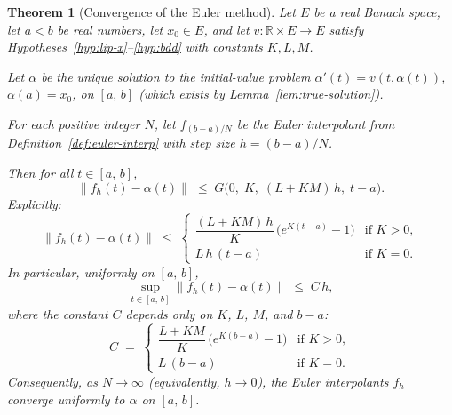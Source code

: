 \documentclass[11pt,a4paper]{article}
\newtheorem{theorem}{Theorem}[section]
\theoremstyle{definition}
\newcommand{\norm}[1]{\lVert #1 \rVert}
\newcommand{\R}{\mathbb{R}}
\newcommand{\Icc}[2]{[#1,\, #2]}
\begin{document}
\begin{theorem}[Convergence of the Euler method]
\label{thm:main}
Let $E$ be a real Banach space, let $a < b$ be real numbers,
let $x_0 \in E$, and let $v \colon \R \times E \to E$ satisfy
Hypotheses~\ref{hyp:lip-x}--\ref{hyp:bdd} with constants $K, L, M$.

Let $\alpha$ be the unique solution to the initial-value problem
$\alpha'(t) = v(t, \alpha(t))$, $\alpha(a) = x_0$, on $\Icc{a}{b}$
(which exists by Lemma~\ref{lem:true-solution}).

For each positive integer $N$, let $f_{(b-a)/N}$ be the Euler
interpolant from Definition~\ref{def:euler-interp} with step size
$h = (b-a)/N$.

Then for all $t \in \Icc{a}{b}$,
\begin{equation}\label{eq:main-bound}
  \norm{f_h(t) - \alpha(t)}
  \;\le\; G\bigl(0,\; K,\; (L + KM)\,h,\; t - a\bigr).
\end{equation}
Explicitly:
\begin{equation}\label{eq:main-explicit}
  \norm{f_h(t) - \alpha(t)}
  \;\le\;
  \begin{cases}
    \dfrac{(L + KM)\,h}{K}\,
    \bigl(e^{K(t-a)} - 1\bigr)
    & \text{if } K > 0, \\[6pt]
    L\,h\,(t - a)
    & \text{if } K = 0.
  \end{cases}
\end{equation}
In particular, uniformly on $\Icc{a}{b}$,
\begin{equation}\label{eq:main-uniform}
  \sup_{t \in \Icc{a}{b}} \norm{f_h(t) - \alpha(t)}
  \;\le\; C\,h,
\end{equation}
where the constant $C$ depends only on $K$, $L$, $M$, and $b - a$:
\begin{equation}\label{eq:C-def}
  C \;=\;
  \begin{cases}
    \dfrac{L + KM}{K}\,\bigl(e^{K(b-a)} - 1\bigr)
    & \text{if } K > 0, \\[6pt]
    L\,(b-a)
    & \text{if } K = 0.
  \end{cases}
\end{equation}
Consequently, as $N \to \infty$ (equivalently, $h \to 0$),
the Euler interpolants $f_h$ converge uniformly to $\alpha$ on
$\Icc{a}{b}$.
\end{theorem}
\end{document}
